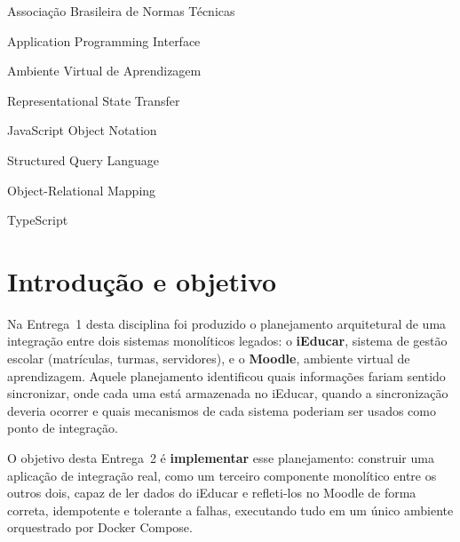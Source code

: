 \documentclass[
	12pt, openright, twoside, a4paper,
	english,
	brazil
	]{abntex2}
\begin{document}
\listoffigures*
\cleardoublepage

\listoftables*
\cleardoublepage

\begin{siglas}
  \item[ABNT] Associa\c{c}\~ao Brasileira de Normas T\'ecnicas
  \item[API] Application Programming Interface
  \item[AVA] Ambiente Virtual de Aprendizagem
  \item[REST] Representational State Transfer
  \item[JSON] JavaScript Object Notation
  \item[SQL] Structured Query Language
  \item[ORM] Object-Relational Mapping
  \item[TS] TypeScript
\end{siglas}

\tableofcontents*
\cleardoublepage

\textual

\chapter{Introdu\c{c}\~ao e objetivo}

Na Entrega~1 desta disciplina foi produzido o planejamento arquitetural de uma integra\c{c}\~ao
entre dois sistemas monol\'iticos legados: o \textbf{iEducar}, sistema de gest\~ao escolar
(matr\'iculas, turmas, servidores), e o \textbf{Moodle}, ambiente virtual de aprendizagem. Aquele
planejamento identificou quais informa\c{c}\~oes fariam sentido sincronizar, onde cada uma est\'a
armazenada no iEducar, quando a sincroniza\c{c}\~ao deveria ocorrer e quais mecanismos de cada
sistema poderiam ser usados como ponto de integra\c{c}\~ao.

O objetivo desta Entrega~2 \'e \textbf{implementar} esse planejamento: construir uma aplica\c{c}\~ao
de integra\c{c}\~ao real, como um terceiro componente monol\'itico entre os outros dois, capaz de
ler dados do iEducar e refleti-los no Moodle de forma correta, idempotente e tolerante a falhas,
executando tudo em um \'unico ambiente orquestrado por Docker Compose.
\end{document}
